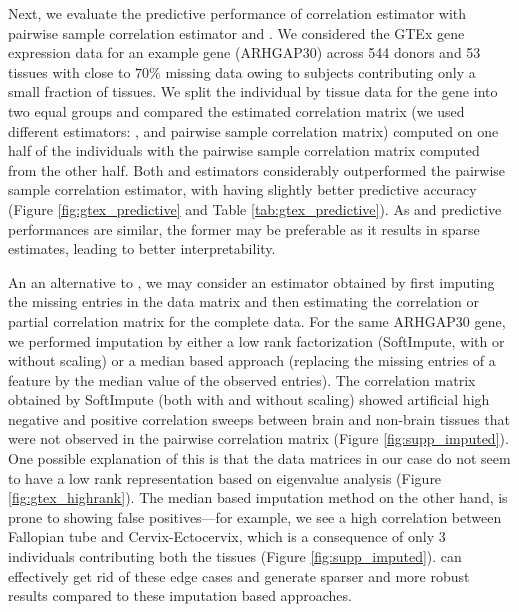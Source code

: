 Next, we evaluate the predictive performance of \Robocov{} correlation estimator with pairwise sample correlation estimator and \CorShrink{}. We considered the GTEx gene expression data for an example gene (ARHGAP30) across 544 donors and 53 tissues with close to $70 \%$ missing data owing to subjects contributing only a small fraction of tissues. We split the individual by tissue data for the gene into two equal groups and  compared the estimated correlation matrix (we used different estimators: \Robocov{}, \CorShrink{} and pairwise sample correlation matrix) computed on one half of the individuals with the pairwise sample correlation matrix computed from the other half.  Both \Robocov{} and \CorShrink{} estimators considerably outperformed the pairwise sample correlation estimator, with \CorShrink{} having slightly better predictive accuracy (Figure \ref{fig:gtex_predictive} and Table \ref{tab:gtex_predictive}). As \Robocov{} and \CorShrink{} predictive performances are similar, the former may be preferable 
as it results in sparse estimates, leading to better interpretability. 


An an alternative to \Robocov{}, we may consider an estimator obtained by first imputing the missing entries in the data matrix and then estimating the correlation or partial correlation matrix for the complete data. For the same ARHGAP30 gene, we performed imputation by either a low rank factorization (SoftImpute\cite{mazumder2015}, with or without scaling) or a median based approach (replacing the missing entries of a feature by the median value of the observed entries). The correlation matrix obtained by SoftImpute (both  with and without scaling) showed artificial high negative and positive correlation sweeps between brain and non-brain tissues that were not observed in the pairwise correlation matrix (Figure \ref{fig:supp_imputed}). One possible explanation of this is that the data matrices in our case do not seem to have a low rank representation based on eigenvalue analysis (Figure \ref{fig:gtex_highrank}).  The median based imputation method on the other hand, is prone to showing false positives---for example, we see a high correlation between Fallopian tube and Cervix-Ectocervix, which is a consequence of only 3 individuals contributing  both the tissues (Figure \ref{fig:supp_imputed}). \Robocov{} can effectively get rid of these edge cases and generate sparser and more robust results compared to these imputation based approaches.

